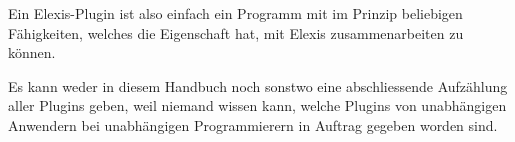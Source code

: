 Ein Elexis-Plugin ist also einfach ein Programm mit im Prinzip beliebigen Fähigkeiten, welches die Eigenschaft hat, mit Elexis zusammenarbeiten zu können.

Es kann weder in diesem Handbuch noch sonstwo eine abschliessende Aufzählung aller Plugins geben, weil niemand wissen kann, welche Plugins von unabhängigen Anwendern bei unabhängigen Programmierern in Auftrag gegeben worden sind. 